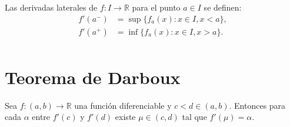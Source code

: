 \documentclass{article}
\begin{document}
Las derivadas laterales de $f:I\to\mathbb{R}$ para el punto $a\in I$ se definen:
\begin{align*}
f'(a^{-})&=\sup\{f_a(x): x\in I, x<a\},\\
f'(a^{+})&=\inf\{f_a(x): x\in I, x>a\}.\\
\end{align*}

\section*{Teorema de Darboux}

Sea $f:(a,b)\to\mathbb{R}$ una función diferenciable y $c<d\in(a,b)$. Entonces para cada $\alpha$ entre $f'(c)$ y $f'(d)$ existe $\mu\in(c,d)$ tal que $f'(\mu)=\alpha$.
\end{document}
